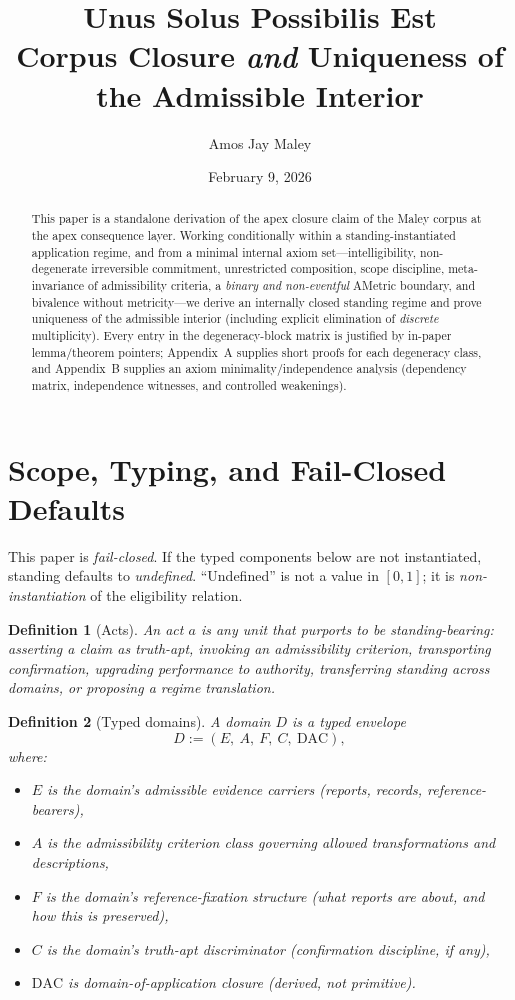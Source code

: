 \documentclass[12pt]{article}
\title{Unus Solus Possibilis Est\\
\large Corpus Closure \emph{and} Uniqueness of the Admissible Interior\\}
\author{Amos Jay Maley}
\date{February 9, 2026}
\newtheorem{definition}{Definition}
\begin{document}
\maketitle

\begin{abstract}
This paper is a standalone derivation of the apex closure claim of the Maley corpus at the apex consequence layer.
Working conditionally within a standing-instantiated application regime, and from a minimal internal axiom set---intelligibility, non-degenerate irreversible commitment, unrestricted composition,
scope discipline, meta-invariance of admissibility criteria, a \emph{binary and non-eventful} AMetric boundary,
and bivalence without metricity---we derive an internally closed standing regime and prove uniqueness of the
admissible interior (including explicit elimination of \emph{discrete} multiplicity).
Every entry in the degeneracy-block matrix is justified by in-paper lemma/theorem pointers; Appendix~A supplies
short proofs for each degeneracy class, and Appendix~B supplies an axiom minimality/independence analysis (dependency matrix,
independence witnesses, and controlled weakenings).
\end{abstract}

\tableofcontents

\section{Scope, Typing, and Fail-Closed Defaults}
\label{sec:scope}

This paper is \emph{fail-closed}. If the typed components below are not instantiated,
standing defaults to \emph{undefined}. ``Undefined'' is not a value in $[0,1]$; it is
\emph{non-instantiation} of the eligibility relation.

\begin{definition}[Acts]
An \emph{act} $a$ is any unit that purports to be standing-bearing: asserting a claim as truth-apt,
invoking an admissibility criterion, transporting confirmation, upgrading performance to authority,
transferring standing across domains, or proposing a regime translation.
\end{definition}

\begin{definition}[Typed domains]
A \emph{domain} $D$ is a typed envelope
\[
D := (E,\ A,\ F,\ C,\ \mathrm{DAC}),
\]
where:
\begin{itemize}[leftmargin=2.2em]
  \item $E$ is the domain's admissible evidence carriers (reports, records, reference-bearers),
  \item $A$ is the admissibility criterion class governing allowed transformations and descriptions,
  \item $F$ is the domain's reference-fixation structure (what reports are about, and how this is preserved),
  \item $C$ is the domain's truth-apt discriminator (confirmation discipline, if any),
  \item $\mathrm{DAC}$ is domain-of-application closure (derived, not primitive).
\end{itemize}
\end{definition}
\end{document}
